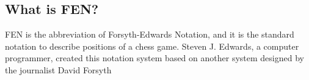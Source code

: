 
\subsection{What is FEN?}

FEN is the abbreviation of Forsyth-Edwards Notation, and it is the standard notation to describe positions of a chess game. 
Steven J. Edwards, a computer programmer,  created this notation system based on another system designed by the journalist David Forsyth

